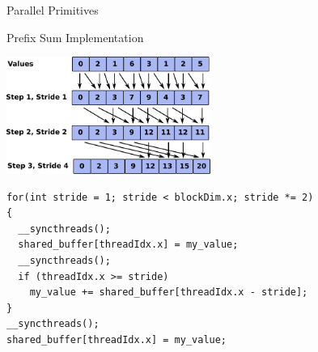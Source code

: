 

\begin{frame}[fragile]{Parallel Primitives}

 \begin{block}{Prefix Sum Implementation}
  \begin{center} \includegraphics[width=0.5\textwidth]{figures/prefixsum} \end{center}
  \begin{lstlisting}
for(int stride = 1; stride < blockDim.x; stride *= 2)
{
  __syncthreads();
  shared_buffer[threadIdx.x] = my_value;
  __syncthreads();
  if (threadIdx.x >= stride)
    my_value += shared_buffer[threadIdx.x - stride];
}
__syncthreads();
shared_buffer[threadIdx.x] = my_value;
  \end{lstlisting}
 \end{block}
\end{frame}











